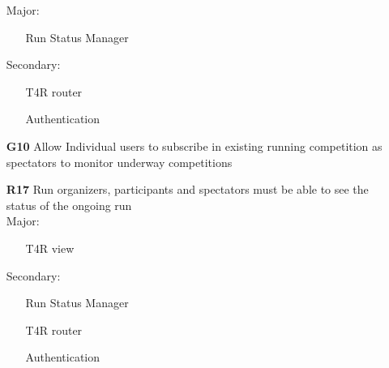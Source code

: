 \begin{itemize}
Major:
\begin{itemize}
\item[\textbullet]Run Status Manager
\end{itemize}
Secondary:
\begin{itemize}
\item[\textbullet]T4R router
\item[\textbullet]Authentication
\end{itemize}

\item [\textbf{G10}] Allow Individual users to subscribe in existing running competition as spectators to monitor underway competitions

\subitem \textbf{R17} Run organizers, participants and spectators must be able to see the status of the ongoing run\\

Major:
\begin{itemize}
\item[\textbullet]T4R view
\end{itemize}
Secondary:
\begin{itemize}
\item[\textbullet]Run Status Manager
\item[\textbullet]T4R router
\item[\textbullet]Authentication
\end{itemize}
\end{itemize}
